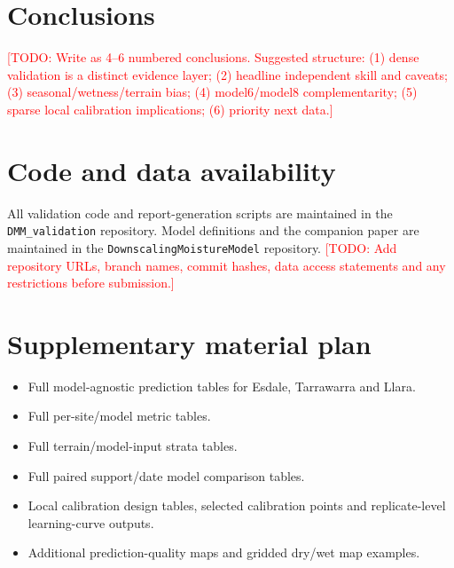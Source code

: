 \documentclass[11pt,a4paper]{article}
\newcommand{\todo}[1]{\textcolor{red}{[TODO: #1]}}
\begin{document}
\section{Conclusions}\label{sec:conclusions}

\todo{Write as 4--6 numbered conclusions.  Suggested structure:
(1) dense validation is a distinct evidence layer; (2) headline independent
skill and caveats; (3) seasonal/wetness/terrain bias; (4) model6/model8
complementarity; (5) sparse local calibration implications; (6) priority next
data.}

\section*{Code and data availability}

All validation code and report-generation scripts are maintained in the
\texttt{DMM\_validation} repository.  Model definitions and the companion paper
are maintained in the \texttt{DownscalingMoistureModel} repository.
\todo{Add repository URLs, branch names, commit hashes, data access statements
and any restrictions before submission.}

\section*{Supplementary material plan}

\begin{itemize}
\item Full model-agnostic prediction tables for Esdale, Tarrawarra and Llara.
\item Full per-site/model metric tables.
\item Full terrain/model-input strata tables.
\item Full paired support/date model comparison tables.
\item Local calibration design tables, selected calibration points and
  replicate-level learning-curve outputs.
\item Additional prediction-quality maps and gridded dry/wet map examples.
\end{itemize}



\end{document}
